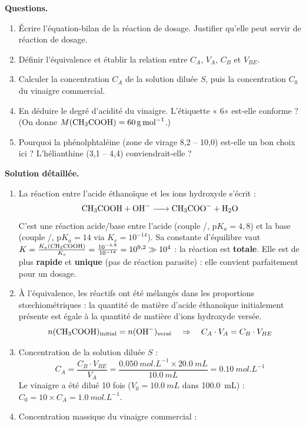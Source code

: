 \documentclass[11pt]{article}
\newcommand{\cle}[1]{{\popxbold\color{popdark}#1}}
\newcounter{popsec}
\newcounter{popsub}
\newcommand{\courssub}[1]{%
  \stepcounter{popsub}%
  \par\vspace{9pt}\noindent{\popxbold\fontsize{11.5}{13}\selectfont\color{popink}{\color{poporange}\thepopsec.\thepopsub}\hspace{6pt}#1}\par\nopagebreak\vspace{4pt}
}
\begin{document}
\courssub{Exploitation}

\begin{exoresolu}
\textbf{Questions.}
\begin{enumerate}
\item Écrire l'équation-bilan de la réaction de dosage. Justifier qu'elle peut servir de réaction de dosage.
\item Définir l'équivalence et établir la relation entre $C_A$, $V_A$, $C_B$ et $V_{BE}$.
\item Calculer la concentration $C_A$ de la solution diluée $S$, puis la concentration $C_0$ du vinaigre commercial.
\item En déduire le degré d'acidité du vinaigre. L'étiquette « 6\textdegree » est-elle conforme ? (On donne $M(\ce{CH3COOH}) = \SI{60}{g.mol^{-1}}$.)
\item Pourquoi la phénolphtaléine (zone de virage 8,2 -- 10,0) est-elle un bon choix ici ? L'hélianthine (3,1 -- 4,4) conviendrait-elle ?
\end{enumerate}
\tcblower
\textbf{Solution détaillée.}
\begin{enumerate}
\item La réaction entre l'acide éthanoïque et les ions hydroxyde s'écrit :
\[ \ce{CH3COOH + OH- -> CH3COO- + H2O} \]
C'est une réaction acide/base entre l'acide  (couple /, $\mathrm{p}K_a = 4,8$) et la base  (couple /, $\mathrm{p}K_a = 14$ via $K_e = 10^{-14}$).
Sa constante d'équilibre vaut $K = \frac{K_a(\ce{CH3COOH})}{K_e} = \frac{10^{-4,8}}{10^{-14}} = 10^{9,2} \gg 10^4$ : la réaction est \textbf{totale}. Elle est de plus \textbf{rapide} et \textbf{unique} (pas de réaction parasite) : elle convient parfaitement pour un dosage.
\item À l'\cle{équivalence}, les réactifs ont été mélangés dans les proportions stœchiométriques : la quantité de matière d'acide éthanoïque initialement présente est égale à la quantité de matière d'ions hydroxyde versée.
\[ n(\ce{CH3COOH})_{\text{initial}} = n(\ce{OH-})_{\text{versé}} \quad \Rightarrow \quad C_A \cdot V_A = C_B \cdot V_{BE} \]
\item Concentration de la solution diluée $S$ :
\[ C_A = \frac{C_B \cdot V_{BE}}{V_A} = \frac{\SI{0,050}{mol.L^{-1}} \times \SI{20,0}{mL}}{\SI{10,0}{mL}} = \SI{0,10}{mol.L^{-1}} \]
Le vinaigre a été dilué 10 fois ($V_0 = \SI{10,0}{mL}$ dans \SI{100,0}{mL}) : $C_0 = 10 \times C_A = \SI{1,0}{mol.L^{-1}}$.
\item Concentration massique du vinaigre commercial :

\end{enumerate}
\end{exoresolu}
\end{document}
